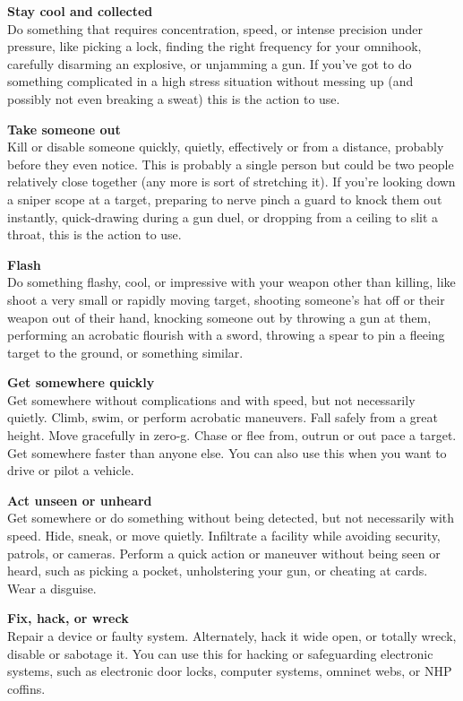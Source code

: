 \textbf{Stay cool and collected}\\
Do something that requires concentration, speed, or intense precision under pressure, like picking a lock, finding the right frequency for your omnihook, carefully disarming an explosive, or unjamming a gun. If you’ve got to do something complicated in a high stress situation without messing up (and possibly not even breaking a sweat) this is the action to use. 

\textbf{Take someone out}\\
Kill or disable someone quickly, quietly, effectively or from a distance, probably before they even notice. This is probably a single person but could be two people relatively close together (any more is sort of stretching it). If you’re looking down a sniper scope at a target, preparing to nerve pinch a guard to knock them out instantly, quick-drawing during a gun duel, or dropping from a ceiling to slit a throat, this is the action to use.

\textbf{Flash}\\
Do something flashy, cool, or impressive with your weapon other than killing, like shoot a very small or rapidly moving target, shooting someone’s hat off or their weapon out of their hand, knocking someone out by throwing a gun at them, performing an acrobatic flourish with a sword, throwing a spear to pin a fleeing target to the ground, or something similar.

\textbf{Get somewhere quickly}\\
Get somewhere without complications and with speed, but not necessarily quietly. Climb, swim, or perform acrobatic maneuvers. Fall safely from a great height. Move gracefully in zero-g. Chase or flee from, outrun or out pace a target. Get somewhere faster than anyone else. You can also use this when you want to drive or pilot a vehicle.

\textbf{Act unseen or unheard}\\
Get somewhere or do something without being detected, but not necessarily with speed. Hide, sneak, or move quietly. Infiltrate a facility while avoiding security, patrols, or cameras. Perform a quick action or maneuver without being seen or heard, such as picking a pocket, unholstering your gun, or cheating at cards. Wear a disguise.

\textbf{Fix, hack, or wreck}\\
Repair a device or faulty system. Alternately, hack it wide open, or totally wreck, disable or sabotage it. You can use this for hacking or safeguarding electronic systems, such as electronic door locks, computer systems, omninet webs, or NHP coffins.

